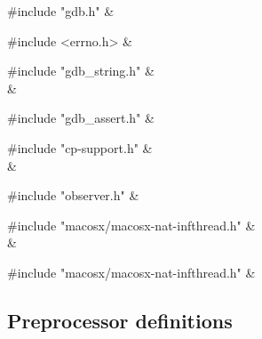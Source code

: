 \medskip
\begin{cxreftabi}
{\stt \#include "gdb.h"} &\\
\end{cxreftabi}

\medskip
\begin{cxreftabi}
{\stt \#include <errno.h>} &\\
\end{cxreftabi}

\medskip
\begin{cxreftabi}
{\stt \#include "gdb\_string.h"} &\\
\hspace*{0.2in}{\stt \#include <string.h>} &\\
\end{cxreftabi}

\medskip
\begin{cxreftabi}
{\stt \#include "gdb\_assert.h"} &\\
\end{cxreftabi}

\medskip
\begin{cxreftabi}
{\stt \#include "cp-support.h"} &\\
\hspace*{0.2in}{\stt \#include "symtab.h"} &\\
\end{cxreftabi}

\medskip
\begin{cxreftabi}
{\stt \#include "observer.h"} &\\
\end{cxreftabi}

\medskip
\begin{cxreftabi}
{\stt \#include "macosx/macosx-nat-infthread.h"} &\\
\hspace*{0.2in}{\stt \#include <mach/mach.h>} &\\
\end{cxreftabi}

\medskip
\begin{cxreftabi}
{\stt \#include "macosx/macosx-nat-infthread.h"} &\\
\end{cxreftabi}


\subsection*{Preprocessor definitions}

